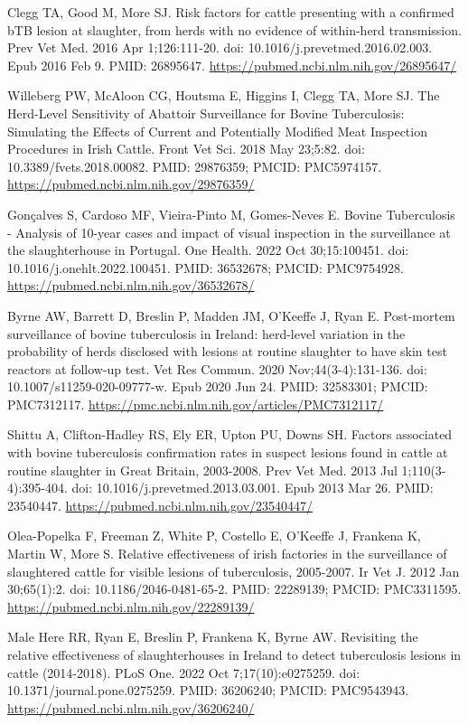 \documentclass[
  letterpaper,
  DIV=11,
  numbers=noendperiod]{scrreprt}
\begin{document}
Clegg TA, Good M, More SJ. Risk factors for cattle presenting with a
confirmed bTB lesion at slaughter, from herds with no evidence of
within-herd transmission. Prev Vet Med. 2016 Apr 1;126:111-20. doi:
10.1016/j.prevetmed.2016.02.003. Epub 2016 Feb 9. PMID: 26895647.
\url{https://pubmed.ncbi.nlm.nih.gov/26895647/}

Willeberg PW, McAloon CG, Houtsma E, Higgins I, Clegg TA, More SJ. The
Herd-Level Sensitivity of Abattoir Surveillance for Bovine Tuberculosis:
Simulating the Effects of Current and Potentially Modified Meat
Inspection Procedures in Irish Cattle. Front Vet Sci. 2018 May 23;5:82.
doi: 10.3389/fvets.2018.00082. PMID: 29876359; PMCID: PMC5974157.
\url{https://pubmed.ncbi.nlm.nih.gov/29876359/}

Gonçalves S, Cardoso MF, Vieira-Pinto M, Gomes-Neves E. Bovine
Tuberculosis - Analysis of 10-year cases and impact of visual inspection
in the surveillance at the slaughterhouse in Portugal. One Health. 2022
Oct 30;15:100451. doi: 10.1016/j.onehlt.2022.100451. PMID: 36532678;
PMCID: PMC9754928. \url{https://pubmed.ncbi.nlm.nih.gov/36532678/}

Byrne AW, Barrett D, Breslin P, Madden JM, O'Keeffe J, Ryan E.
Post-mortem surveillance of bovine tuberculosis in Ireland: herd-level
variation in the probability of herds disclosed with lesions at routine
slaughter to have skin test reactors at follow-up test. Vet Res Commun.
2020 Nov;44(3-4):131-136. doi: 10.1007/s11259-020-09777-w. Epub 2020 Jun
24. PMID: 32583301; PMCID: PMC7312117.
\url{https://pmc.ncbi.nlm.nih.gov/articles/PMC7312117/}

Shittu A, Clifton-Hadley RS, Ely ER, Upton PU, Downs SH. Factors
associated with bovine tuberculosis confirmation rates in suspect
lesions found in cattle at routine slaughter in Great Britain,
2003-2008. Prev Vet Med. 2013 Jul 1;110(3-4):395-404. doi:
10.1016/j.prevetmed.2013.03.001. Epub 2013 Mar 26. PMID: 23540447.
\url{https://pubmed.ncbi.nlm.nih.gov/23540447/}

Olea-Popelka F, Freeman Z, White P, Costello E, O'Keeffe J, Frankena K,
Martin W, More S. Relative effectiveness of irish factories in the
surveillance of slaughtered cattle for visible lesions of tuberculosis,
2005-2007. Ir Vet J. 2012 Jan 30;65(1):2. doi: 10.1186/2046-0481-65-2.
PMID: 22289139; PMCID: PMC3311595.
\url{https://pubmed.ncbi.nlm.nih.gov/22289139/}

Male Here RR, Ryan E, Breslin P, Frankena K, Byrne AW. Revisiting the
relative effectiveness of slaughterhouses in Ireland to detect
tuberculosis lesions in cattle (2014-2018). PLoS One. 2022 Oct
7;17(10):e0275259. doi: 10.1371/journal.pone.0275259. PMID: 36206240;
PMCID: PMC9543943. \url{https://pubmed.ncbi.nlm.nih.gov/36206240/}
\end{document}
